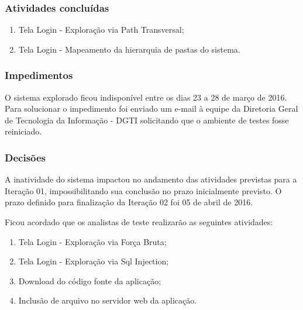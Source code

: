 \documentclass[
    12pt,               %
    openright,          %
    oneside,            %
    a4paper,            %
    section=TITLE,     %
    english,            %
    french,             %
    spanish,            %
    brazil              %
    ]{abntex2}
\begin{document}
\subsubsection*{Atividades concluídas}


\begin{enumerate}[start=1]
	
\item Tela Login - Exploração via Path Transversal;
	
\item Tela Login - Mapeamento da hierarquia de pastas do sistema.

\end{enumerate}


\subsubsection*{Impedimentos}

O sistema explorado ficou indisponível entre os dias 23 a 28 de março de 2016. Para solucionar o impedimento foi enviado um e-mail à equipe da Diretoria Geral de Tecnologia da Informação - DGTI solicitando que o ambiente de testes fosse reiniciado.



\subsubsection*{Decisões}

A inatividade do sistema impactou no andamento das atividades previstas para a Iteração 01, impossibilitando sua conclusão no prazo inicialmente previsto. O prazo definido para finalização da Iteração 02 foi 05 de abril de 2016.


Ficou acordado que os analistas de teste realizarão as seguintes atividades:



\begin{enumerate}[start=1]
	
\item Tela Login - Exploração via Força Bruta;
	
\item Tela Login - Exploração via Sql Injection;
	
\item Download do código fonte da aplicação;
	
\item Inclusão de arquivo no servidor web da aplicação.

\end{enumerate}
\end{document}
